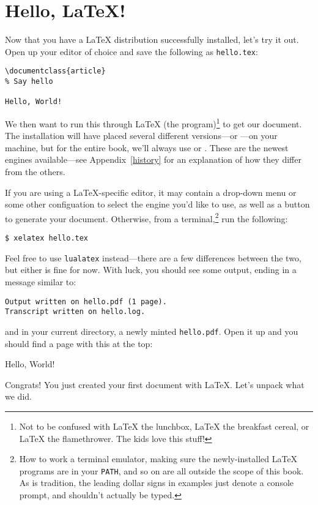 \chapter{Hello, \texorpdfstring{\LaTeX}{LaTeX}!}

Now that you have a \LaTeX{} distribution successfully installed,
let's try it out.
Open up your editor of choice and save the following as \texttt{hello.tex}:
\begin{leftfigure}
\begin{lstlisting}
\documentclass{article}
% Say hello

Hello, World!

\end{lstlisting}
\end{leftfigure}
We then want to run this through \LaTeX{} (the program)\footnote{Not to be
confused with \LaTeX{} the lunchbox, \LaTeX{} the breakfast cereal,
or \LaTeX{} the flamethrower. The kids love this stuff!}
to get our document.
The installation will have placed several different versions---or
---on your machine,
but for the entire book, we'll always use \LuaLaTeX or \XeLaTeX.
These are the newest engines available---see Appendix~\ref{history} for an
explanation of how they differ from the others.

If you are using a \LaTeX{}-specific editor, it may contain a drop-down menu
or some other configuation to select the engine you'd like to use,
as well as a button to generate your document.
Otherwise, from a terminal,\punckern\footnote{How to work a terminal emulator,
making sure the newly-installed \LaTeX{} programs are in your \texttt{PATH},
and so on are all outside the scope of this book.
As is tradition, the leading dollar signs in examples just denote a console
prompt, and shouldn't actually be typed.}
run the following:
\begin{leftfigure}
\begin{lstlisting}
$ xelatex hello.tex
\end{lstlisting}
\end{leftfigure}
Feel free to use \texttt{lualatex} instead---there are a few differences
between the two, but either is fine for now.
With luck, you should see some output, ending in a message similar to:
\begin{leftfigure}
\begin{lstlisting}
Output written on hello.pdf (1 page).
Transcript written on hello.log.
\end{lstlisting}
\end{leftfigure}
and in your current directory, a newly minted \texttt{hello.pdf}.
Open it up and you should find a page with this at the top:
\begin{leftfigure}
\lm Hello, World!
\end{leftfigure}
Congrats!
You just created your first document with \LaTeX.
Let's unpack what we did.

